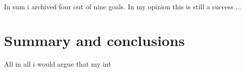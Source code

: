 \documentclass[11pt, titlepage, a4paper]{article}
\begin{document}
In sum i archived four out of nine goals. In my opinion this is still a success ...

\section{Summary and conclusions}

All in all i would argue that my int

\clearpage




\end{document}
